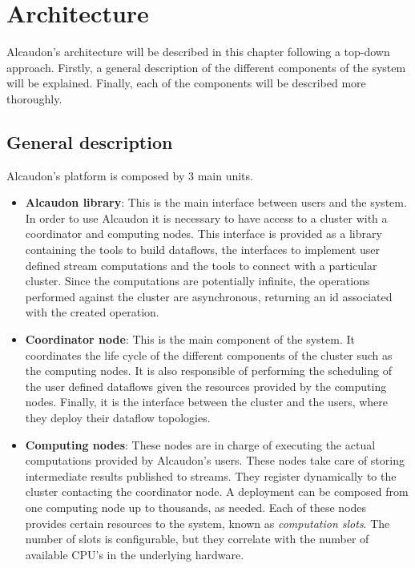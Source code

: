 \chapter{Architecture}
\label{chapter:architecture}

Alcaudon's architecture will be described in this chapter following a top-down
approach. Firstly, a general description of the different components of the system
will be explained. Finally, each of the components will be described more thoroughly.

\section{General description}

Alcaudon's platform is composed by 3 main units.

\begin{itemize}
\item \textbf{Alcaudon library}: This is the main interface between users
  and the system. In order to use Alcaudon it is necessary to have access to a
  cluster with a coordinator and computing nodes. This interface is provided as
  a library containing the tools to build dataflows, the interfaces to implement
  user defined stream computations and the tools to connect with a particular
  cluster. Since the computations are potentially infinite, the operations
  performed against the cluster are asynchronous, returning an id associated
  with the created operation.
\item \textbf{Coordinator node}: This is the main component of the system. It
  coordinates the life cycle of the different components of the cluster such as
  the computing nodes. It is also responsible of performing the scheduling of
  the user defined dataflows given the resources provided by the computing
  nodes. Finally, it is the interface between the cluster and the users, where
  they deploy their dataflow topologies.

\item \textbf{Computing nodes}: These nodes are in charge of executing the
  actual computations provided by Alcaudon's users. These nodes take care of
  storing intermediate results published to streams. They register dynamically
  to the cluster contacting the coordinator node. A deployment can be composed
  from one computing node up to thousands, as needed. Each of these nodes
  provides certain resources to the system, known as \textit{computation slots}.
  The number of slots is configurable, but they correlate with the number of
  available CPU's in the underlying hardware.
\end{itemize}


